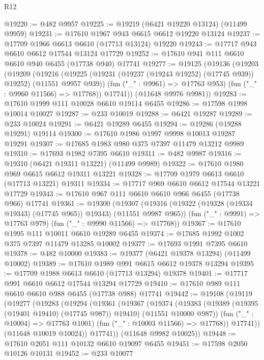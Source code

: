 \begin{lexlean}{R12}
\begin{coremodule}
@19220 := @482 @9957
@19225 := @19219 (@6421 @19220 @13124) (@11499 @9959)
@19231 := @17610 @1967 @943 @6615 @6612 @19220 @13124
@19237 := @17709 @1966 @6613 @6610 (@17713 @13124) @19220
@19243 := @17717 @943 @6610 @6612 @17544 @13124 @17729
@19252 := @17610 @941 @111 @6610 @6610 @940 @6455 (@17738 @940) @17741
@19277 := @19125
    (@19136
      (@19203
        (@19209
          (@19216
            (@19225 (@19231 (@19237 (@19243 @19252) (@17745 @939)) @19252) (@11551 @9957 @939))
            (fun ("_" : @9961) => @17763 @953)
            (fun ("_" : @9960 @11566) => @17768))
          @17741))
      (@11648 @9976 @9981))
@19283 := @17610 @1999 @111 @10028 @6610 @19114 @6455
@19286 := @17598 @1998 @10014 @10027
@19287 := @233 @10019
@19288 := @6421 @19287
@19289 := @233 @10024
@19291 := @6421 @19289 @6455
@19294 := @19286 (@19288 @19291) @19114
@19300 := @17610 @1986 @1997 @9998 @10013 @19287 @19291
@19307 := @17685 @1983 @980 @375 @7397 @11479 @13212 @9989
@19310 := @17693 @1982 @7395 @6610
@19311 := @482 @9987
@19316 := @19310 (@6421 @19311 @13221) (@11499 @9989)
@19322 := @17610 @1980 @969 @6615 @6612 @19311 @13221
@19328 := @17709 @1979 @6613 @6610 (@17713 @13221) @19311
@19334 := @17717 @969 @6610 @6612 @17544 @13221 @17729
@19343 := @17610 @967 @111 @6610 @6610 @966 @6455 (@17738 @966) @17741
@19361 := @19300
    (@19307
      (@19316 (@19322 (@19328 (@19334 @19343) (@17745 @965)) @19343) (@11551 @9987 @965))
      (fun ("_" : @9991) => @17763 @979)
      (fun ("_" : @9990 @11566) => @17768))
@19367 := @17610 @1995 @111 @10011 @6610 @19289 @6455
@19374 := @17685 @1992 @1002 @375 @7397 @11479 @13285 @10002
@19377 := @17693 @1991 @7395 @6610
@19378 := @482 @10000
@19383 := @19377 (@6421 @19378 @13294) (@11499 @10002)
@19389 := @17610 @1989 @991 @6615 @6612 @19378 @13294
@19395 := @17709 @1988 @6613 @6610 (@17713 @13294) @19378
@19401 := @17717 @991 @6610 @6612 @17544 @13294 @17729
@19410 := @17610 @989 @111 @6610 @6610 @988 @6455 (@17738 @988) @17741
@19442 := @19108
    (@19119
      (@19277
        (@19283
          (@19294
            (@19361
              (@19367
                (@19374
                  (@19383
                    (@19389 (@19395 (@19401 @19410) (@17745 @987)) @19410)
                    (@11551 @10000 @987))
                  (fun ("_" : @10004) => @17763 @1001)
                  (fun ("_" : @10003 @11566) => @17768))
                @17741))
            (@11648 @10019 @10024))
          @17741))
      (@11648 @9982 @10025))
@19448 := @17610 @2051 @111 @10132 @6610 @19097 @6455
@19451 := @17598 @2050 @10126 @10131
@19452 := @233 @10077

\end{coremodule}
\end{lexlean}
